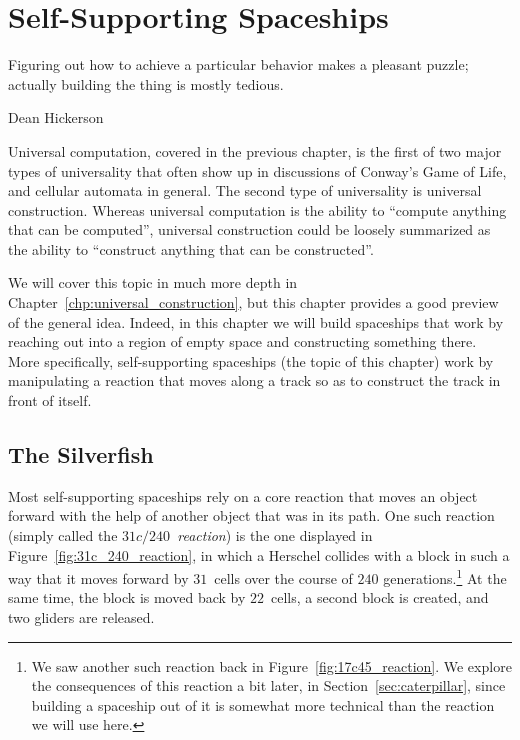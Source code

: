 
\renewcommand{\chapterfolder}{self_support_spaceships/}
\chapter{Self-Supporting Spaceships}\label{chp:self_support_spaceships}


\vspace*{-0.4in}
\epigraph{Figuring out how to achieve a particular behavior makes a pleasant puzzle; actually building the thing is mostly tedious.}{Dean Hickerson}
\vspace*{0.4in}


\noindent Universal computation, covered in the previous chapter, is the first of two major types of universality that often show up in discussions of Conway's Game of Life, and cellular automata in general. The second type of universality is universal construction. Whereas universal computation is the ability to ``compute anything that can be computed'', universal construction could be loosely summarized as the ability to ``construct anything that can be constructed''.

We will cover this topic in much more depth in Chapter~\ref{chp:universal_construction}, but this chapter provides a good preview of the general idea. Indeed, in this chapter we will build spaceships that work by reaching out into a region of empty space and constructing something there. More specifically, self-supporting spaceships (the topic of this chapter) work by manipulating a reaction that moves along a track so as to construct the track in front of itself.


\section{The Silverfish}\label{sec:silverfish}

Most self-supporting spaceships rely on a core reaction that moves an object forward with the help of another object that was in its path. One such reaction (simply called the \emph{$31c/240$~reaction}) is the one displayed in Figure~\ref{fig:31c_240_reaction}, in which a Herschel collides with a block in such a way that it moves forward by $31$~cells over the course of $240$ generations.\footnote{We saw another such reaction back in Figure~\ref{fig:17c45_reaction}. We explore the consequences of this reaction a bit later, in Section~\ref{sec:caterpillar}, since building a spaceship out of it is somewhat more technical than the reaction we will use here.} At the same time, the block is moved back by $22$~cells, a second block is created, and two gliders are released.

